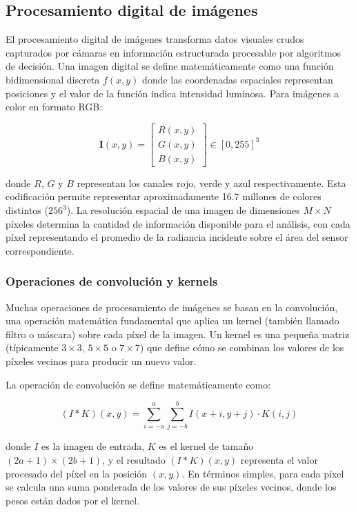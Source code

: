 \subsection{Procesamiento digital de imágenes}

El procesamiento digital de imágenes transforma datos visuales crudos capturados por cámaras en información estructurada procesable por algoritmos de decisión. Una imagen digital se define matemáticamente como una función bidimensional discreta $f(x,y)$ donde las coordenadas espaciales representan posiciones y el valor de la función indica intensidad luminosa. Para imágenes a color en formato RGB:

\begin{equation}
\mathbf{I}(x,y) = \begin{bmatrix} R(x,y) \\ G(x,y) \\ B(x,y) \end{bmatrix} \in [0, 255]^3
\end{equation}

donde $R$, $G$ y $B$ representan los canales rojo, verde y azul respectivamente. Esta codificación permite representar aproximadamente 16.7 millones de colores distintos ($256^3$). La resolución espacial de una imagen de dimensiones $M \times N$ píxeles determina la cantidad de información disponible para el análisis, con cada píxel representando el promedio de la radiancia incidente sobre el área del sensor correspondiente.

\subsubsection{Operaciones de convolución y kernels}

Muchas operaciones de procesamiento de imágenes se basan en la convolución, una operación matemática fundamental que aplica un kernel (también llamado filtro o máscara) sobre cada píxel de la imagen. Un kernel es una pequeña matriz (típicamente $3 \times 3$, $5 \times 5$ o $7 \times 7$) que define cómo se combinan los valores de los píxeles vecinos para producir un nuevo valor.

La operación de convolución se define matemáticamente como:

\begin{equation}
(I \ast K)(x,y) = \sum_{i=-a}^{a} \sum_{j=-b}^{b} I(x+i, y+j) \cdot K(i,j)
\end{equation}

donde $I$ es la imagen de entrada, $K$ es el kernel de tamaño $(2a+1) \times (2b+1)$, y el resultado $(I \ast K)(x,y)$ representa el valor procesado del píxel en la posición $(x,y)$. En términos simples, para cada píxel se calcula una suma ponderada de los valores de sus píxeles vecinos, donde los pesos están dados por el kernel.

